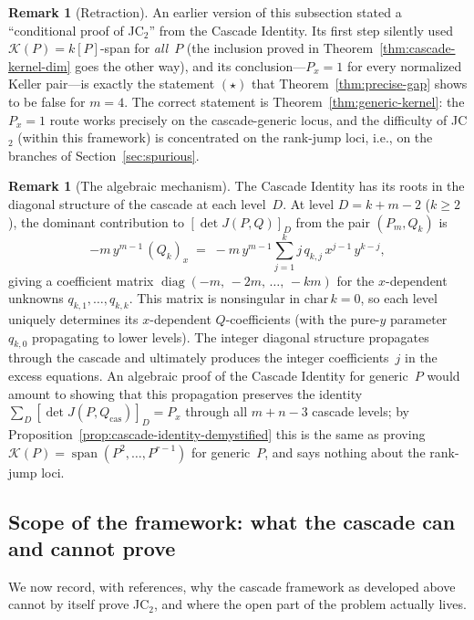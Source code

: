 \documentclass[12pt,a4paper]{article}
\theoremstyle{definition}
\newtheorem{remark}[theorem]{Remark}
\newcommand{\kk}{k}
\begin{document}
\begin{remark}[Retraction]\label{rem:retraction}
An earlier version of this subsection stated a ``conditional proof of
JC$_2$'' from the Cascade Identity. Its first step silently used
$\mathcal{K}(P) = \kk[P]$-span for \emph{all}~$P$ (the inclusion
proved in Theorem~\ref{thm:cascade-kernel-dim} goes the other way),
and its conclusion---$P_x = 1$ for every normalized Keller
pair---is exactly the statement $(\star)$ that
Theorem~\ref{thm:precise-gap} shows to be false for $m = 4$.
The correct statement is Theorem~\ref{thm:generic-kernel}: the
$P_x = 1$ route works precisely on the cascade-generic locus, and the
difficulty of JC$_2$ (within this framework) is concentrated on the
rank-jump loci, i.e., on the branches of Section~\ref{sec:spurious}.
\end{remark}

\begin{remark}[The algebraic mechanism]\label{rem:diag-matrix}
The Cascade Identity has its roots in the diagonal structure of the
cascade at each level~$D$.  At level $D = k + m - 2$ ($k \geq 2$),
the dominant contribution to $[\det J(P,Q)]_D$ from the pair
$(P_m, Q_k)$ is
\[
  -m\,y^{m-1}\,(Q_k)_x \;=\;
  -m\,y^{m-1} \sum_{j=1}^{k} j\,q_{k,j}\, x^{j-1}\,y^{k-j},
\]
giving a coefficient matrix
$\operatorname{diag}(-m,\, -2m,\, \ldots,\, -km)$
for the $x$-dependent unknowns $q_{k,1}, \ldots, q_{k,k}$.
This matrix is nonsingular in $\mathrm{char}\,\kk = 0$,
so each level uniquely determines its $x$-dependent $Q$-coefficients
(with the pure-$y$ parameter $q_{k,0}$ propagating to lower levels).
The integer diagonal structure propagates through the cascade and
ultimately produces the integer coefficients~$j$ in the excess equations.
An algebraic proof of the Cascade Identity for generic~$P$ would amount
to showing that this propagation preserves the identity
$\sum_D [\det J(P, Q_{\mathrm{cas}})]_D = P_x$
through all $m + n - 3$ cascade levels; by
Proposition~\ref{prop:cascade-identity-demystified} this is the same as
proving $\mathcal{K}(P) = \operatorname{span}(P^2,\ldots,P^{r-1})$
for generic~$P$, and says nothing about the rank-jump loci.
\end{remark}

\subsection{Scope of the framework: what the cascade can and cannot prove}%
\label{sec:scope}

We now record, with references, why the cascade framework as developed
above cannot by itself prove JC$_2$, and where the open part of the
problem actually lives.
\end{document}
